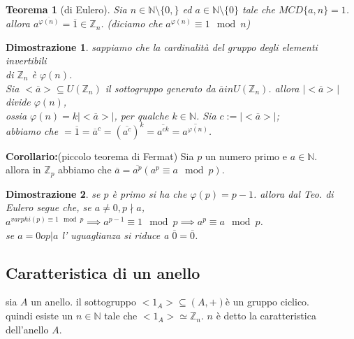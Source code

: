 \documentclass[a4paper,12pt]{article}
\theoremstyle{def}
\theoremstyle{prop}
\theoremstyle{esempio}
\theoremstyle{dimostrazione}
\newtheorem*{dimostrazione}{Dimostrazione}
\theoremstyle{teo}
\newtheorem*{teorema}{Teorema}
\theoremstyle{osservazione}
\begin{document}
\begin{teorema}[di Eulero]
    Sia \(n \in \mathbb{N} \setminus \{0,\}\) ed \(a \in \mathbb{N} \setminus \{0\}\) tale che \(MCD\{a,n\} = 1\).\\
    allora \(a^{\overline{\varphi(n)}} = \overline{1} \in \mathbb{Z}_n\). (diciamo che \(a^{\varphi(n)} \equiv 1 \mod n\))\\
\end{teorema}

\begin{dimostrazione}
    sappiamo che la cardinalità del gruppo degli elementi invertibili \\
    di \(\mathbb{Z}_n\) è \(\varphi(n)\).\\
    Sia \(<\overline{a}> \subseteq U(\mathbb{Z}_n)\) il sottogruppo generato da \(\overline{a} in U(\mathbb{Z}_n)\). allora \(|<\overline{a}>|\) divide \(\varphi(n)\),\\
    ossia \(\varphi(n) = k |<\overline{a}>|\), per qualche \(k \in \mathbb{N}\). Sia \(c := |<\overline{a}>|\);\\
    abbiamo che \( = \overline{1} = \overline{a}^c = (\overline{a^c})^k  = \overline{a^{ck}} = \overline{a^{\varphi(n)}} \).\\
\end{dimostrazione}

\textbf{Corollario:}(piccolo teorema di Fermat) Sia \(p\) un numero primo e \(a \in \mathbb{N}\).\\
allora in \(\mathbb{Z}_p\) abbiamo che \(\overline{a} = \overline{a^p} (a^p \equiv a \mod p)\).\\

\begin{dimostrazione}
    se \(p\) è primo si ha che \(\varphi(p) = p-1\). allora dal Teo. di Eulero segue che, se \(a \neq 0, p \nmid a\), \(a^{varphi(p) \equiv 1 \mod p}\implies a ^{p-1} \equiv 1 \mod p \implies a^p \equiv a \mod p\).\\
    se \(a = 0 o p | a\) l' uguaglianza si riduce a \(\overline{0} = \overline{0}\).
\end{dimostrazione}

\newpage

\subsection{Caratteristica di un anello}
sia \(A\) un anello. il sottogruppo \(<1_A> \subseteq (A,+)\)è un gruppo ciclico.\\
quindi esiste un \(n \in \mathbb{N}\) tale che \(<1_A> \simeq \mathbb{Z}_n\). \(n\) è detto la caratteristica dell'anello \(A\).\\
\end{document}
